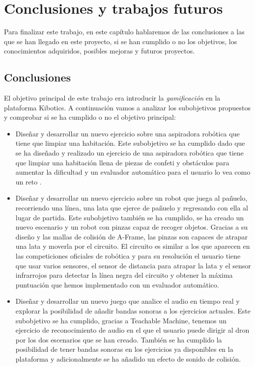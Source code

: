 \chapter{Conclusiones y trabajos futuros}\label{conclusion}
Para finalizar este trabajo, en este capítulo hablaremos de las conclusiones a las que se han llegado en este proyecto, si se han cumplido o no los objetivos,  los conocimientos adquiridos, posibles mejoras y futuros proyectos.

\section{Conclusiones}

El objetivo principal de este trabajo era introducir la \textit{gamificación} en la plataforma Kibotics. A continuación vamos a analizar los subobjetivos propuestos y comprobar si se ha cumplido o no el objetivo principal:

\begin{itemize}
    \item Diseñar y desarrollar un nuevo ejercicio sobre una aspiradora robótica que tiene que limpiar una habitación.  Este subobjetivo se ha cumplido dado que se ha  diseñado y realizado un ejercicio de una aspiradora robótica que tiene que limpiar una habitación llena de piezas de confeti y obstáculos para aumentar la dificultad y un evaluador automático para  el usuario lo vea como un reto .

    \item Diseñar y desarrollar un nuevo ejercicio sobre un robot que juega al pañuelo, recorriendo una línea, una lata que ejerce de pañuelo y regresando con ella al lugar de partida. Este subobjetivo también se ha cumplido, se ha creado un nuevo escenario y un robot con pinzas capaz de recoger objetos. Gracias a su diseño y las mallas de colisión de A-Frame, las pinzas son capaces de atrapar una lata y moverla por el circuito. El circuito es similar a los que aparecen en las competiciones oficiales de robótica y para su resolución el usuario tiene que usar varios sensores, el sensor de distancia para atrapar la lata y el sensor infrarrojos para detectar la línea negra del circuito y obtener la máxima puntuación que hemos implementado con un evaluador automático. 
    
        \item Diseñar y desarrollar un nuevo juego que analice el audio en tiempo real y explorar la posibilidad de añadir bandas sonoras a los ejercicios actuales.  Este subobjetivo se ha cumplido, gracias a Teachable Machine, tenemos un ejercicio de reconocimiento de audio en el que el usuario puede dirigir al dron por los dos escenarios que se han creado. También se ha cumplido la posibilidad de tener bandas sonoras en los ejercicios ya disponibles en la plataforma y adicionalmente se ha añadido un efecto de sonido de colisión. 

\end{itemize}

